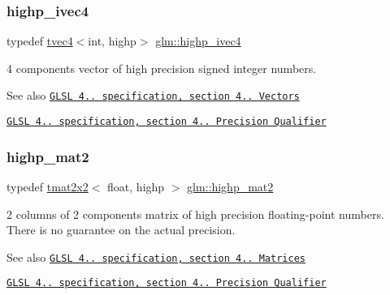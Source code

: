 \subsubsection{\texorpdfstring{highp\+\_\+ivec4}{highp\_ivec4}}
{\footnotesize\ttfamily typedef \hyperlink{structglm_1_1tvec4}{tvec4}$<$int, highp$>$ \hyperlink{group__core__precision_ga9303c2a9e1f1e761961eeecbcda2d34f}{glm\+::highp\+\_\+ivec4}}

4 components vector of high precision signed integer numbers.

\begin{DoxySeeAlso}{See also}
\href{http://www.opengl.org/registry/doc/GLSLangSpec.4.20.8.pdf}{\tt G\+L\+SL 4.. specification, section 4.. Vectors} 

\href{http://www.opengl.org/registry/doc/GLSLangSpec.4.20.8.pdf}{\tt G\+L\+SL 4.. specification, section 4.. Precision Qualifier} 
\end{DoxySeeAlso}
\mbox{\label{group__core__precision_ga8539ada9351e0a74964fa23c040246cf}} 
\subsubsection{\texorpdfstring{highp\+\_\+mat2}{highp\_mat2}}
{\footnotesize\ttfamily typedef \hyperlink{structglm_1_1tmat2x2}{tmat2x2}$<$ float, highp $>$ \hyperlink{group__core__precision_ga8539ada9351e0a74964fa23c040246cf}{glm\+::highp\+\_\+mat2}}

2 columns of 2 components matrix of high precision floating-\/point numbers. There is no guarantee on the actual precision.

\begin{DoxySeeAlso}{See also}
\href{http://www.opengl.org/registry/doc/GLSLangSpec.4.20.8.pdf}{\tt G\+L\+SL 4.. specification, section 4.. Matrices} 

\href{http://www.opengl.org/registry/doc/GLSLangSpec.4.20.8.pdf}{\tt G\+L\+SL 4.. specification, section 4.. Precision Qualifier} 
\end{DoxySeeAlso}
\mbox{\label{group__core__precision_ga20b66861ebdfa14586f4028c5ef16d2e}} 
